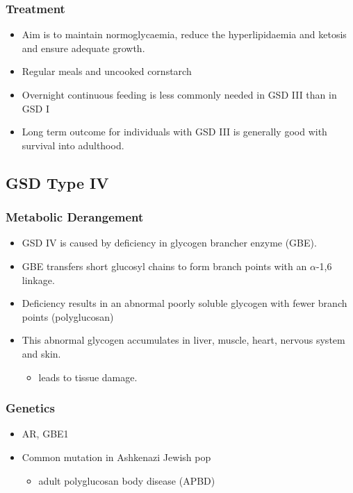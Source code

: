 \documentclass{scrartcl}
\begin{document}
\subsubsection{Treatment}
\label{sec:org41ce528}
\begin{itemize}
\item Aim is to maintain normoglycaemia, reduce the hyperlipidaemia and ketosis and
ensure adequate growth.
\item Regular meals and uncooked cornstarch
\item Overnight continuous feeding is less commonly needed in GSD III than
in GSD I
\item Long term outcome for individuals with GSD III is generally good
with survival into adulthood.
\end{itemize}
\subsection{GSD Type IV}
\label{sec:orgdd8c33d}
\subsubsection{Metabolic Derangement}
\label{sec:orgbf7ef1b}
\begin{itemize}
\item GSD IV is caused by deficiency in glycogen brancher enzyme (GBE).
\item GBE transfers short glucosyl chains to form branch points with an
\(\alpha\)-1,6 linkage.
\item Deficiency results in an abnormal poorly soluble glycogen with fewer branch points (polyglucosan)
\item This abnormal glycogen accumulates in liver, muscle, heart, nervous system and skin.
\begin{itemize}
\item leads to tissue damage.
\end{itemize}
\end{itemize}

\subsubsection{Genetics}
\label{sec:orgaeb6135}
\begin{itemize}
\item AR, GBE1
\item Common mutation in Ashkenazi Jewish pop
\begin{itemize}
\item adult polyglucosan body disease (APBD)
\end{itemize}
\end{itemize}
\end{document}
